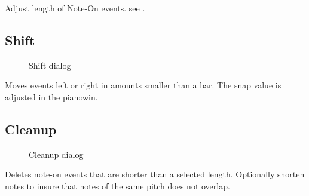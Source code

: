 \documentclass[letterpaper]{report}
\begin{document}
Adjust length of Note-On events. see .


\subsection{Shift}\label{shift}

\begin{figure}
\caption{Shift dialog}
\end{figure}

Moves events left or right in amounts smaller than a bar. The snap value is
adjusted in the pianowin.

\subsection{Cleanup}\label{cleanup}

\begin{figure}
\caption{Cleanup dialog}
\end{figure}

Deletes note-on events that are shorter than a selected length. Optionally
shorten notes to insure that notes of the same pitch does not overlap.
\end{document}
